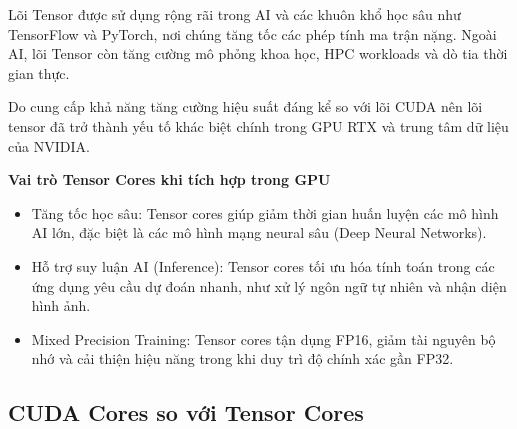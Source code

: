 \documentclass[a4paper]{article}
\begin{document}
Lõi Tensor được sử dụng rộng rãi trong AI và các khuôn khổ học sâu như TensorFlow và PyTorch, nơi chúng tăng tốc các phép tính ma trận nặng. Ngoài AI, lõi Tensor còn tăng cường mô phỏng khoa học, HPC workloads và dò tia thời gian thực.

Do cung cấp khả năng tăng cường hiệu suất đáng kể so với lõi CUDA nên lõi tensor đã trở thành yếu tố khác biệt chính trong GPU RTX và trung tâm dữ liệu của NVIDIA.
    
\textbf{Vai trò Tensor Cores khi tích hợp trong GPU}
\begin{itemize}
    \item Tăng tốc học sâu: Tensor cores giúp giảm thời gian huấn luyện các mô hình AI
    lớn, đặc biệt là các mô hình mạng neural sâu (Deep Neural Networks).
    \item Hỗ trợ suy luận AI (Inference): Tensor cores tối ưu hóa tính toán trong các ứng
    dụng yêu cầu dự đoán nhanh, như xử lý ngôn ngữ tự nhiên và nhận diện hình ảnh.
    \item Mixed Precision Training: Tensor cores tận dụng FP16, giảm tài nguyên bộ nhớ
    và cải thiện hiệu năng trong khi duy trì độ chính xác gần FP32.
\end{itemize}

\subsection{CUDA Cores so với Tensor Cores}
    
\end{document}
